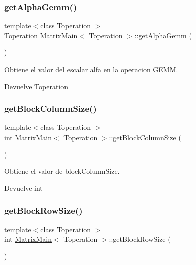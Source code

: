\subsubsection{\texorpdfstring{get\+Alpha\+Gemm()}{getAlphaGemm()}}
{\footnotesize\ttfamily template$<$class Toperation $>$ \\
Toperation \hyperlink{classMatrixMain}{Matrix\+Main}$<$ Toperation $>$\+::get\+Alpha\+Gemm (\begin{DoxyParamCaption}{ }\end{DoxyParamCaption})}



Obtiene el valor del escalar alfa en la operacion G\+E\+MM. 

\begin{DoxyReturn}{Devuelve}
Toperation 
\end{DoxyReturn}
\mbox{\label{classMatrixMain_ad2dafe8a675361da10486c8c7b3e16cd}} 
\subsubsection{\texorpdfstring{get\+Block\+Column\+Size()}{getBlockColumnSize()}}
{\footnotesize\ttfamily template$<$class Toperation $>$ \\
int \hyperlink{classMatrixMain}{Matrix\+Main}$<$ Toperation $>$\+::get\+Block\+Column\+Size (\begin{DoxyParamCaption}{ }\end{DoxyParamCaption})}



Obtiene el valor de block\+Column\+Size. 

\begin{DoxyReturn}{Devuelve}
int 
\end{DoxyReturn}
\mbox{\label{classMatrixMain_ab30c2ac0e3100c1e248fbdc1bcbb146c}} 
\subsubsection{\texorpdfstring{get\+Block\+Row\+Size()}{getBlockRowSize()}}
{\footnotesize\ttfamily template$<$class Toperation $>$ \\
int \hyperlink{classMatrixMain}{Matrix\+Main}$<$ Toperation $>$\+::get\+Block\+Row\+Size (\begin{DoxyParamCaption}{ }\end{DoxyParamCaption})}



